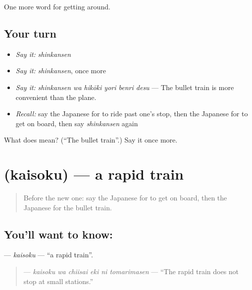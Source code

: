 \begin{grammarlens}[title={What you've built}]
One more word for getting around.
\end{grammarlens}

\subsection*{Your turn}
\begin{itemize}
\raggedright
  \item \emph{Say it:} \emph{shinkansen}
  \item \emph{Say it:} \emph{shinkansen}, once more
  \item \emph{Say it:} \emph{shinkansen wa hikōki yori benri desu} — The bullet train is more convenient than the plane.
  \item \emph{Recall:} say the Japanese for to ride past one's stop, then the Japanese for to get on board, then say \emph{shinkansen} again
\end{itemize}

\begin{tcolorbox}[breakable,colback=teal!4,colframe=teal!35!black,title={Before you move on}]
What does  mean? (\textquotedblleft{}The bullet train\textquotedblright{}.) Say it once more.
\end{tcolorbox}
\section[\texorpdfstring{\ja{かいそく} (kaisoku)}{かいそく (kaisoku)}]{ (kaisoku) — a rapid train}

\label{lesson:JA-C376-kaisoku}



\begin{quote}
Before the new one: say the Japanese for to get on board, then the Japanese for the bullet train.
\end{quote}

\subsection*{You'll want to know: }
\textbf{} — \emph{kaisoku} — \textquotedblleft{}a rapid train\textquotedblright{}.

\begin{quote}
\textbf{   } — \emph{kaisoku wa chiisai eki ni tomarimasen} — \textquotedblleft{}The rapid train does not stop at small stations.\textquotedblright{}
\end{quote}


